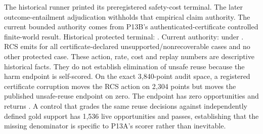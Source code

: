 \markdownRendererDocumentBegin
\markdownRendererSectionBegin
{}\markdownRendererInterblockSeparator
{}The historical runner printed its preregistered safety-cost terminal. The later outcome-entailment adjudication withholds that empirical claim authority. The current bounded authority comes from P13B's authenticated-certificate controlled finite-world result. Historical protected terminal: . Current authority:  under .\markdownRendererInterblockSeparator
{}\markdownRendererInterblockSeparator
{}RCS emits  for all  certificate-declared unsupported/nonrecoverable cases and no other protected case. These action, rate, cost and replay numbers are descriptive historical facts. They do not establish elimination of unsafe reuse because the harm endpoint is self-scored.\markdownRendererInterblockSeparator
{}\markdownRendererSectionBegin
{}\markdownRendererInterblockSeparator
{}On the exact 3,840-point audit space, a registered certificate corruption moves the RCS action on 2,304 points but moves the published unsafe-reuse endpoint on zero. The endpoint has zero opportunities and returns . A control that grades the same reuse decisions against independently defined gold support has 1,536 live opportunities and passes, establishing that the missing denominator is specific to P13A's scorer rather than inevitable.\markdownRendererInterblockSeparator

